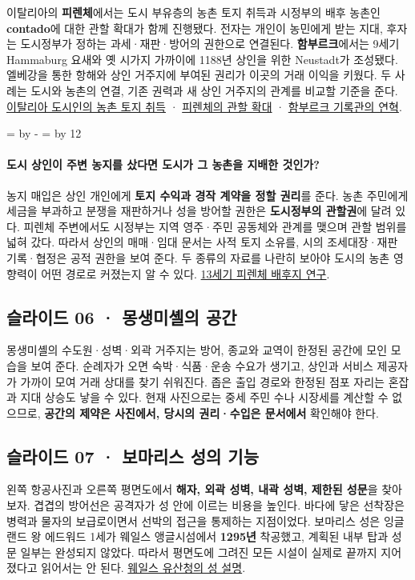 \documentclass[10pt,a4paper]{article}
\newcommand{\ReserveQuestionSpace}{%
  \par\begingroup
  \dimen0=\pagegoal \advance\dimen0 by -\pagetotal
  \dimen2=\baselineskip \multiply\dimen2 by 12
  \ifdim\dimen0<\dimen2 \newpage\fi
  \endgroup}
\begin{document}
이탈리아의 \textbf{피렌체}에서는 도시 부유층의 농촌 토지 취득과 시정부의 배후 농촌인 \textbf{contado}에 대한 관할 확대가 함께 진행됐다. 전자는 개인이 농민에게 받는 지대, 후자는 도시정부가 정하는 과세·재판·방어의 권한으로 연결된다. \textbf{함부르크}에서는 9세기 Hammaburg 요새와 옛 시가지 가까이에 1188년 상인을 위한 Neustadt가 조성됐다. 엘베강을 통한 항해와 상인 거주지에 부여된 권리가 이곳의 거래 이익을 키웠다. 두 사례는 도시와 농촌의 연결, 기존 권력과 새 상인 거주지의 관계를 비교할 기준을 준다. \href{https://academic.oup.com/book/5795/chapter-abstract/148991397}{이탈리아 도시인의 농촌 토지 취득} · \href{https://www.sciencedirect.com/science/article/pii/0304418186900199}{피렌체의 관할 확대} · \href{https://www.hamburg.de/politik-und-verwaltung/behoerden/behoerde-fuer-kultur-und-medien/einrichtungen/staatsarchiv/hafengeburtstag-hamburg-1173356}{함부르크 기록관의 연혁}.\par

\ReserveQuestionSpace
\paragraph{도시 상인이 주변 농지를 샀다면 도시가 그 농촌을 지배한 것인가?}
농지 매입은 상인 개인에게 \textbf{토지 수익과 경작 계약을 정할 권리}를 준다. 농촌 주민에게 세금을 부과하고 분쟁을 재판하거나 성을 방어할 권한은 \textbf{도시정부의 관할권}에 달려 있다. 피렌체 주변에서도 시정부는 지역 영주·주민 공동체와 관계를 맺으며 관할 범위를 넓혀 갔다. 따라서 상인의 매매·임대 문서는 사적 토지 소유를, 시의 조세대장·재판 기록·협정은 공적 권한을 보여 준다. 두 종류의 자료를 나란히 보아야 도시의 농촌 영향력이 어떤 경로로 커졌는지 알 수 있다. \href{https://www.sciencedirect.com/science/article/pii/0304418186900199}{13세기 피렌체 배후지 연구}.\par

\subsection{슬라이드 06 · 몽생미셸의 공간}
몽생미셸의 수도원·성벽·외곽 거주지는 방어, 종교와 교역이 한정된 공간에 모인 모습을 보여 준다. 순례자가 오면 숙박·식품·운송 수요가 생기고, 상인과 서비스 제공자가 가까이 모여 거래 상대를 찾기 쉬워진다. 좁은 출입 경로와 한정된 점포 자리는 혼잡과 지대 상승도 낳을 수 있다. 현재 사진으로는 중세 주민 수나 시장세를 계산할 수 없으므로, \textbf{공간의 제약은 사진에서, 당시의 권리·수입은 문서에서} 확인해야 한다.\par

\subsection{슬라이드 07 · 보마리스 성의 기능}
왼쪽 항공사진과 오른쪽 평면도에서 \textbf{해자, 외곽 성벽, 내곽 성벽, 제한된 성문}을 찾아보자. 겹겹의 방어선은 공격자가 성 안에 이르는 비용을 높인다. 바다에 닿은 선착장은 병력과 물자의 보급로이면서 선박의 접근을 통제하는 지점이었다. 보마리스 성은 잉글랜드 왕 에드워드 1세가 웨일스 앵글시섬에서 \textbf{1295년} 착공했고, 계획된 내부 탑과 성문 일부는 완성되지 않았다. 따라서 평면도에 그려진 모든 시설이 실제로 끝까지 지어졌다고 읽어서는 안 된다. \href{https://cadw.gov.wales/visit/places-to-visit/beaumaris-castle?lang=en}{웨일스 유산청의 성 설명}.\par
\end{document}
